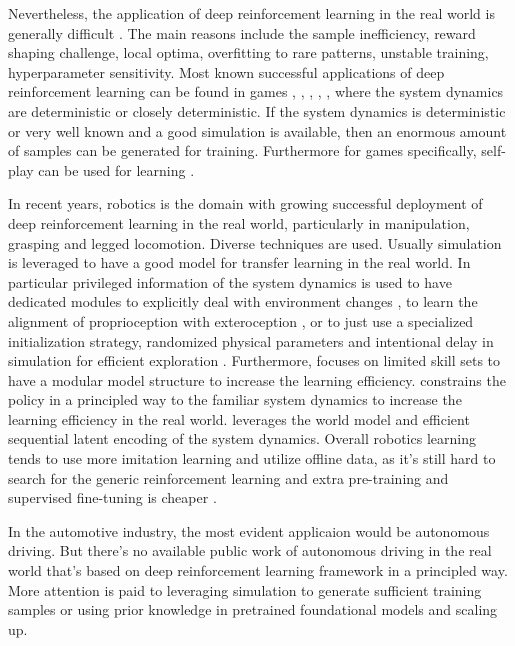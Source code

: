 \documentclass{article}
\begin{document}
Nevertheless, the application of deep reinforcement learning in the real world is generally difficult \parencite{Irpan_2018}. The main reasons include the sample inefficiency, reward shaping challenge, local optima, overfitting to rare patterns, unstable training, hyperparameter sensitivity. Most known successful applications of deep reinforcement learning can be found in games \parencite{mnih13:_playin_atari_deep_reinf_learn}, \parencite{DBLP:journals/nature/SilverHMGSDSAPL16}, \parencite{DBLP:conf/ijcai/BrownS17}, \parencite{openai19:_dota_large_scale_deep_reinf_learn}, \parencite{bakhtin22:_Human_level_diplomacy_cicero}, where the system dynamics are deterministic or closely deterministic.
If the system dynamics is deterministic or very well known and a good simulation is available, then an enormous amount of samples can be generated for training. Furthermore for games specifically, self-play can be used for learning \parencite{Silver_2018}.

In recent years, robotics is the domain with growing successful deployment of deep reinforcement learning in the real world, particularly in manipulation, grasping and legged locomotion. Diverse techniques are used. Usually simulation is leveraged to have a good model for transfer learning in the real world. In particular privileged information of the system dynamics is used to have dedicated modules to explicitly deal with environment changes \parencite{kumar21:_rma}, to learn the alignment of proprioception with exteroception \parencite{Miki_2022}, or to just use a specialized initialization strategy, randomized physical parameters and intentional delay in simulation for efficient exploration \parencite{Song_2023}. Furthermore, \parencite{Hoeller_2024} focuses on limited skill sets to have a modular model structure to increase the learning efficiency. \parencite{smith23:_grow_your_limit} constrains the policy in a principled way to the familiar system dynamics to increase the learning efficiency in the real world. \parencite{wu22:_daydr} leverages the world model and efficient sequential latent encoding of the system dynamics. Overall robotics learning tends to use more imitation learning and utilize offline data, as it's still hard to search for the generic reinforcement learning and extra pre-training and supervised fine-tuning is cheaper \parencite{Irpan_2024}.

In the automotive industry, the most evident applicaion would be autonomous driving. But there's no available public work of autonomous driving in the real world that's based on deep reinforcement learning framework in a principled way. More attention is paid to leveraging simulation to generate sufficient training samples or using prior knowledge in pretrained foundational models and scaling up.
\end{document}
